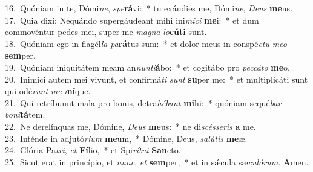 {16.~}Quóniam in te, Dómi\textit{ne}, \textit{spe}\textbf{rá}vi:~* tu exáudies me, Dómi\textit{ne}, \textit{De}\textit{us} \textbf{me}us.\\
{17.~}Quia dixi: Nequándo supergáudeant mihi ini\textit{mí}\textit{ci} \textbf{me}i:~* et dum commovéntur pedes mei, super me \textit{ma}\textit{gna} \textit{lo}\textbf{cú}\textbf{ti} sunt.\\
{18.~}Quóniam ego in flagél\textit{la} \textit{pa}\textbf{rá}tus sum:~* et dolor meus in conspé\textit{ctu} \textit{me}\textit{o} \textbf{sem}per.\\
{19.~}Quóniam iniquitátem meam an\textit{nun}\textit{ti}\textbf{á}bo:~* et cogitábo pro \textit{pec}\textit{cá}\textit{to} \textbf{me}o.\\
{20.~}Inimíci autem mei vivunt, et confirmá\textit{ti} \textit{sunt} \textbf{su}per me:~* et multiplicáti sunt qui odé\textit{runt} \textit{me} \textit{i}\textbf{ní}que.\\
{21.~}Qui retríbuunt mala pro bonis, detra\textit{hé}\textit{bant} \textbf{mi}hi:~* quóniam sequé\textit{bar} \textit{bo}\textit{ni}\textbf{tá}tem.\\
{22.~}Ne derelínquas me, Dómine, \textit{De}\textit{us} \textbf{me}us:~* ne di\textit{scés}\textit{se}\textit{ris} \textbf{a} me.\\
{23.~}Inténde in adjutó\textit{ri}\textit{um} \textbf{me}um,~* Dómine, Deus, \textit{sa}\textit{lú}\textit{tis} \textbf{me}æ.\\
{24.~}Glória Pa\textit{tri}, \textit{et} \textbf{Fí}lio,~* et Spi\textit{rí}\textit{tu}\textit{i} \textbf{San}cto.\\
{25.~}Sicut erat in princípio, et \textit{nunc}, \textit{et} \textbf{sem}per,~* et in sǽcula sæ\textit{cu}\textit{ló}\textit{rum}. \textbf{A}men.\\
